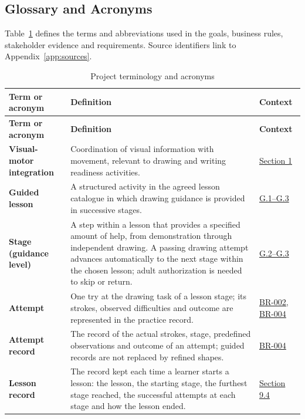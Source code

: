 \documentclass[12pt]{article}
\renewcommand{\_}{\textunderscore\allowbreak}%
\begin{document}
\subsection{Glossary and Acronyms}
\label{sec:glossary}
Table~\ref{tab:glossary} defines the terms and abbreviations used in the goals,
business rules, stakeholder evidence and requirements. Source identifiers link
to Appendix~\ref{app:sources}.

{\small\setlength{\tabcolsep}{4pt}
\begin{longtable}{@{}>{\raggedright\arraybackslash}p{}>{\raggedright\arraybackslash}p{}>{\raggedright\arraybackslash}p{}@{}}
\caption{Project terminology and acronyms}\label{tab:glossary}\\
\toprule
\textbf{Term or acronym} & \textbf{Definition} & \textbf{Context}\\
\midrule
\endfirsthead
\toprule
\textbf{Term or acronym} & \textbf{Definition} & \textbf{Context}\\
\midrule
\endhead
\bottomrule
\endlastfoot
\textbf{Visual-motor integration} & Coordination of visual information with
movement, relevant to drawing and writing readiness activities. &
\hyperref[sec:purpose]{Section 1}\\
\textbf{Guided lesson} & A structured activity in the agreed lesson catalogue in
which drawing guidance is provided in successive stages. &
\hyperref[sec:purpose]{G.1--G.3}\\
\textbf{Stage (guidance level)} & A step within a lesson that provides a
specified amount of help, from demonstration through independent drawing. A
passing drawing attempt advances automatically to the next stage within the
chosen lesson; adult authorization is needed to skip or return. &
\hyperref[sec:purpose]{G.2--G.3}\\
\textbf{Attempt} & One try at the drawing task of a lesson stage; its strokes,
observed difficulties and outcome are represented in the practice record. &
\hyperref[sec:business-rules]{BR-002, BR-004}\\
\textbf{Attempt record} & The record of the actual strokes, stage, predefined
observations and outcome of an attempt; guided records are not replaced by
refined shapes. & \hyperref[sec:business-rules]{BR-004}\\
\textbf{Lesson record} & The record kept each time a learner starts a lesson:
the lesson, the starting stage, the furthest stage reached, the successful
attempts at each stage and how the lesson ended. &
\hyperref[sec:fr-records]{Section 9.4}\\

\end{longtable}}
\end{document}
